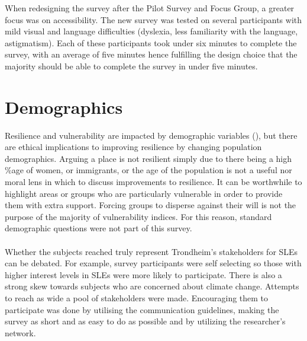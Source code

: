 When redesigning the survey after the Pilot Survey and Focus Group, a greater focus was on accessibility. The new survey was tested on several participants with mild visual and language difficulties (dyslexia, less familiarity with the language, astigmatism).  Each of these participants took under six minutes to complete the survey, with an average of five minutes hence fulfilling the design choice that the majority should be able to complete the survey in under five minutes. 
\paragraph{}



\section{Demographics}
Resilience and vulnerability are impacted by demographic variables (\cite{rod_integrated_2012}), but there are ethical implications to improving resilience by changing population demographics. Arguing a place is not resilient simply due to there being a high \%age of women, or immigrants, or the age of the population is not a useful nor moral lens in which to discuss improvements to resilience. It can be worthwhile to highlight areas or groups who are particularly vulnerable in order to provide them with extra support. Forcing groups to disperse against their will is not the purpose of the majority of vulnerability indices. For this reason, standard demographic questions were not part of this survey. 


\paragraph{}
Whether the subjects reached truly represent Trondheim's stakeholders for SLEs can be debated. For example, survey participants were self selecting so those with higher interest levels in SLEs were more likely to participate. There is also a strong skew towards subjects who are concerned about climate change. Attempts to reach as wide a pool of stakeholders were made. Encouraging them to participate was done by utilising the communication guidelines, making the survey as short and as easy to do as possible and by utilizing the researcher's network. 



